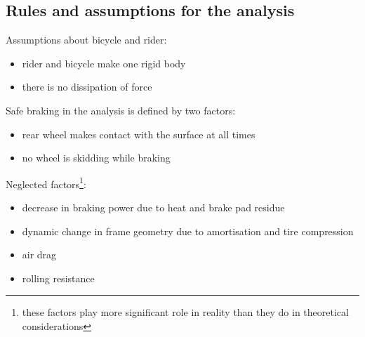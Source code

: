 \documentclass[12pt, a4]{article}
\begin{document}
\subsection{Rules and assumptions for the analysis}
Assumptions about bicycle and rider:
\begin{itemize}
\item{rider and bicycle make one rigid body}
\item{there is no dissipation of force}
\end{itemize}
Safe braking in the analysis is defined by two factors:
\begin{itemize}
\item{rear wheel makes contact with the surface at all times}
\item{no wheel is skidding while braking}
\end{itemize}
Neglected factors\footnote[1]{these factors play more significant role in reality than they do in theoretical
considerations}:
\begin{itemize}
\item{decrease in braking power due to heat and brake pad residue}
\item{dynamic change in frame geometry due to amortisation and tire compression}
\item{air drag}
\item{rolling resistance}
\end{itemize}
\end{document}
